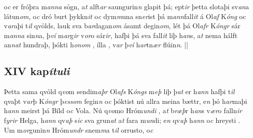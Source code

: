 o\textit{c} er  fróþra m\textit{anna} sỏgn, a\textit{t}
alft\textit{ar} saungurin\textit{n}   glapit   þá; ept\textit{ir}
þetta slotaþi sv\textit{an}a látun\textit{om}, o\textit{c} dró burt 
þykkn\textit{it} o\textit{c} dym\textit{m}una sn\textit{er}ist þá
m\textit{an}\textit{n}fall\textit{it} á Ol\textit{af} K\textit{óng} oc  v\textit{ar}aþi   t\textit{il} qvỏlds,   lauk sva b\textit{ar}dagan\textit{om} ásamt 
degin\textit{om}, lét þá Ol\textit{afr} K\textit{óngr}  sár m\textit{anna} sin\textit{n}a, 
þ\textit{ví} m\textit{ar}g\textit{ir} v\textit{or}o sár\textit{ir}, hafþi þá sva fall\textit{it} liþ
h\textit{an}s, a\textit{t}  nema hálft an\textit{n}\textit{at} hundraþ, þókti h\textit{onom} , ílla  , v\textit{ar} þ\textit{ví} h\textit{ar}tn\textit{ær} flúin\textit{n}.  || 
\pend \endnumbering
  \beginnumbering \pstart 
\vspace{5mm}  \subsection*{XIV kap\textit{ítuli}}
  Þetta sama qvỏld q\textit{vo}m sendim\textit{aþr} Ol\textit{afs}
K\textit{óngs} m\textit{eþ} liþ þ\textit{at} er h\textit{ann} hafþi t\textit{il} qvaþt v\textit{ar}þ   K\textit{óngr} þ\textit{ess}\textit{om} fegin\textit{n} o\textit{c} þóktist  nú allra meina bættr, e\textit{n} þó h\textit{ar}maþi
h\textit{ann} meirst þá Bíld  o\textit{c} Vola. Nú q\textit{vo}mo
Hróm\textit{undi} , a\textit{t}  b\textit{ræþ}r h\textit{an}s v\textit{ær}o  falln\textit{ir}
f\textit{yrir} Helga, h\textit{ann} qv\textit{aþ} s\textit{ic} sva
grun\textit{at}  a\textit{t} fara  m\textit{un}di; e\textit{n} qv\textit{aþ}
h\textit{ann}  o\textit{c} hreysti  .  Um m\textit{or}gunin\textit{n}  Hróm\textit{undr} snem\textit{m}a t\textit{il} orrusto, o\textit{c}
